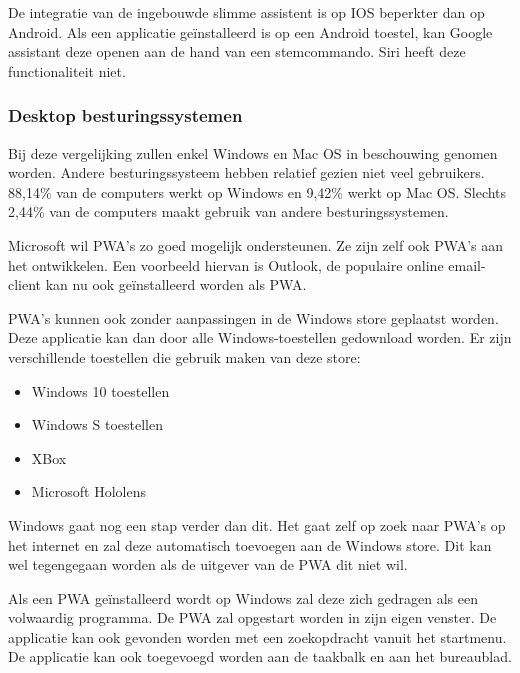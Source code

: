 De integratie van de ingebouwde slimme assistent is op IOS beperkter dan op Android. Als een applicatie geïnstalleerd is op een Android toestel, kan Google assistant deze openen aan de hand van een stemcommando. Siri heeft deze functionaliteit niet.
\autocite{Lathiya2020}

\subsubsection{Desktop besturingssystemen}
Bij deze vergelijking zullen enkel Windows en Mac OS in beschouwing genomen worden. Andere besturingssysteem hebben relatief gezien niet veel gebruikers. 88,14\% van de computers werkt op Windows en 9,42\% werkt op Mac OS. Slechts 2,44\% van de computers maakt gebruik van andere besturingssystemen.
\autocite{netMarketShare2020}

Microsoft wil PWA’s zo goed mogelijk ondersteunen. Ze zijn zelf ook PWA’s aan het ontwikkelen. Een voorbeeld hiervan is Outlook, de populaire online email-client kan nu ook geïnstalleerd worden als PWA.
\autocite{Microsoft2020a}

PWA’s kunnen ook zonder aanpassingen in de Windows store geplaatst worden. Deze applicatie kan dan door alle Windows-toestellen gedownload worden. Er zijn verschillende toestellen die gebruik maken van deze store:
\begin{itemize}
	\item	Windows 10 toestellen
	\item	Windows S toestellen
	\item	XBox
	\item	Microsoft Hololens 
\end{itemize}

Windows gaat nog een stap verder dan dit. Het gaat zelf op zoek naar PWA’s op het internet en zal deze automatisch toevoegen aan de Windows store. Dit kan wel tegengegaan worden als de uitgever van de PWA dit niet wil.
\autocite{Gustafson2017} \autocite{Gustafson2017a}

Als een PWA geïnstalleerd wordt op Windows zal deze zich gedragen als een volwaardig programma. De PWA zal opgestart worden in zijn eigen venster. De applicatie kan ook gevonden worden met een zoekopdracht vanuit het startmenu. De applicatie kan ook toegevoegd worden aan de taakbalk en aan het bureaublad.

